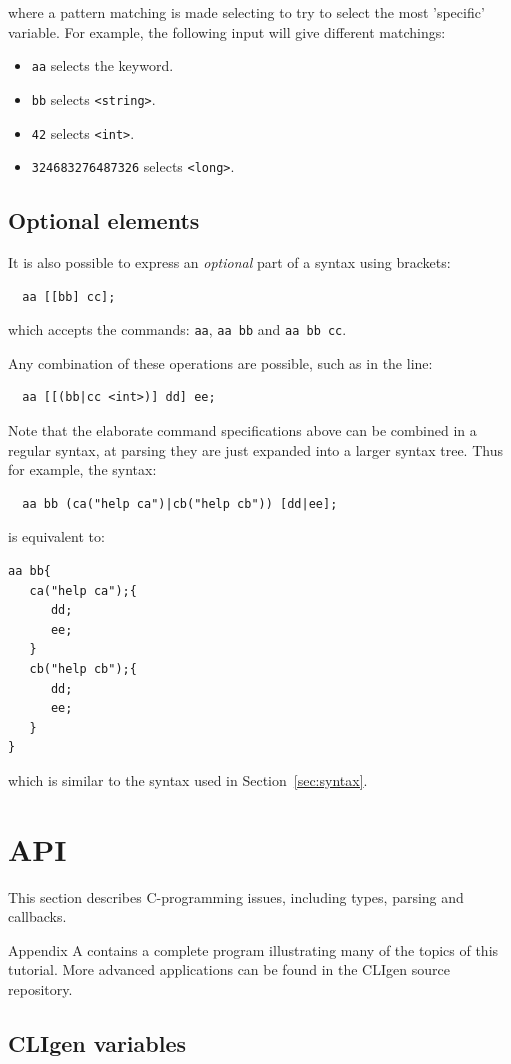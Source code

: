 \documentclass[a4paper, 10pt] {article}
\begin{document}
where a pattern matching is made selecting to try to select the most 'specific'
variable. For example, the following input will give different matchings:
\begin{itemize}
\item
{\tt aa} selects the keyword.
\item
{\tt bb} selects {\tt <string>}.
\item
{\tt 42} selects {\tt <int>}.
\item
{\tt 324683276487326} selects {\tt <long>}.
\end{itemize} 

\subsection{Optional elements}
It is also possible to express an \emph{optional} part of a syntax
using brackets:
\begin{verbatim}
  aa [[bb] cc];
\end{verbatim}
which accepts the commands: {\tt aa}, {\tt aa bb} and  {\tt aa bb cc}.

Any combination of these operations are possible, such as in the line:
\begin{verbatim}
  aa [[(bb|cc <int>)] dd] ee;
\end{verbatim}

Note that the elaborate command specifications above can be combined
in a regular syntax, at parsing they are just expanded into a larger
syntax tree. 
Thus for example, the syntax:
\begin{verbatim}
  aa bb (ca("help ca")|cb("help cb")) [dd|ee];
\end{verbatim}
is equivalent to:
\begin{verbatim}
aa bb{
   ca("help ca");{
      dd;
      ee;
   }
   cb("help cb");{
      dd;
      ee;
   }
}
\end{verbatim}
which is similar to the syntax used in Section~\ref{sec:syntax}.

\section{API}
\label{sec:api}
This section describes C-programming issues, including types, parsing and
callbacks.

Appendix A contains a complete program illustrating many of the topics
of this tutorial.  More advanced applications can be found in the CLIgen
source repository.

\subsection{CLIgen variables}
\end{document}
